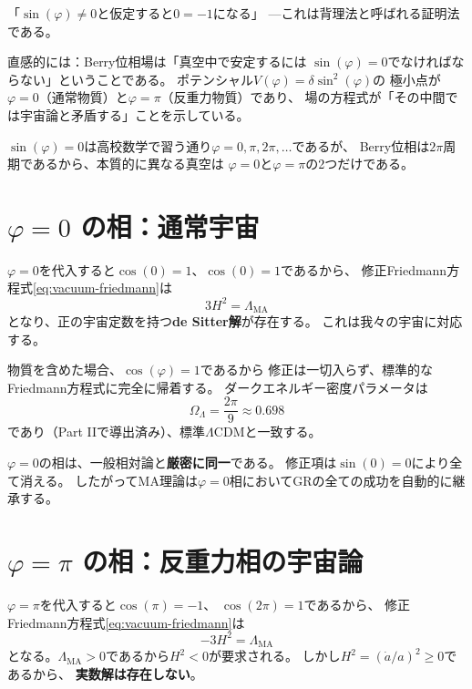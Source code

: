 \begin{hsbox}
「$\sin(\varphi)\neq 0$と仮定すると$0=-1$になる」
---これは背理法と呼ばれる証明法である。

直感的には：Berry位相場は「真空中で安定するには
$\sin(\varphi)=0$でなければならない」ということである。
ポテンシャル$V(\varphi) = \delta\sin^2(\varphi)$の
極小点が$\varphi = 0$（通常物質）と$\varphi = \pi$（反重力物質）であり、
場の方程式が「その中間では宇宙論と矛盾する」ことを示している。

$\sin(\varphi)=0$は高校数学で習う通り$\varphi = 0, \pi, 2\pi, \ldots$であるが、
Berry位相は$2\pi$周期であるから、本質的に異なる真空は
$\varphi = 0$と$\varphi = \pi$の2つだけである。
\end{hsbox}


\section{$\varphi = 0$ の相：通常宇宙}
\label{sec:9.3}

$\varphi = 0$を代入すると$\cos(0)=1$、$\cos(0)=1$であるから、
修正Friedmann方程式\eqref{eq:vacuum-friedmann}は
\begin{equation}
3H^2 = \Lambda_{\mathrm{MA}}
\end{equation}
となり、正の宇宙定数を持つ\textbf{de Sitter解}が存在する。
これは我々の宇宙に対応する。

物質を含めた場合、$\cos(\varphi)=1$であるから
修正は一切入らず、標準的なFriedmann方程式に完全に帰着する。
ダークエネルギー密度パラメータは
\begin{equation}
\Omega_\Lambda = \frac{2\pi}{9} \approx 0.698
\end{equation}
であり（Part IIで導出済み）、標準$\Lambda$CDMと一致する。

\begin{remark}
$\varphi=0$の相は、一般相対論と\textbf{厳密に同一}である。
修正項は$\sin(0)=0$により全て消える。
したがってMA理論は$\varphi=0$相においてGRの全ての成功を自動的に継承する。
\end{remark}


\section{$\varphi = \pi$ の相：反重力相の宇宙論}
\label{sec:9.4}

$\varphi = \pi$を代入すると$\cos(\pi)=-1$、
$\cos(2\pi)=1$であるから、
修正Friedmann方程式\eqref{eq:vacuum-friedmann}は
\begin{equation}
-3H^2 = \Lambda_{\mathrm{MA}}
\end{equation}
となる。$\Lambda_{\mathrm{MA}} > 0$であるから$H^2 < 0$が要求される。
しかし$H^2 = (\dot a / a)^2 \geq 0$であるから、
\textbf{実数解は存在しない}。

